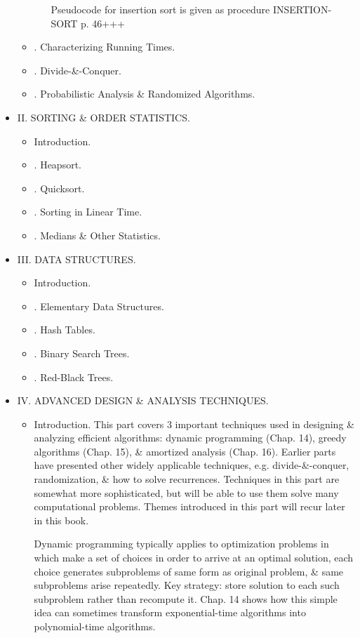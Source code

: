 \documentclass{article}
\begin{document}
\begin{itemize}
\begin{itemize}
\begin{itemize}
            Pseudocode for insertion sort is given as procedure INSERTION-SORT p. 46+++
        \end{itemize}
		\item {. Characterizing Running Times.}
		\item {. Divide-\&-Conquer.}
		\item {. Probabilistic Analysis \& Randomized Algorithms.}
	\end{itemize}
	\item {\sf II. SORTING \& ORDER STATISTICS.}
	\begin{itemize}
		\item {\sf Introduction.}
		\item {. Heapsort.}
		\item {. Quicksort.}
		\item {. Sorting in Linear Time.}
		\item {. Medians \& Other Statistics.}
	\end{itemize}
	\item {\sf III. DATA STRUCTURES.}
	\begin{itemize}
		\item {\sf Introduction.}
		\item {. Elementary Data Structures.}
		\item {. Hash Tables.}
		\item {. Binary Search Trees.}
		\item {. Red-Black Trees.}
	\end{itemize}
	\item {\sf IV. ADVANCED DESIGN \& ANALYSIS TECHNIQUES.}
	\begin{itemize}
		\item {\sf Introduction.} This part covers 3 important techniques used in designing \& analyzing efficient algorithms: dynamic programming (Chap. 14), greedy algorithms (Chap. 15), \& amortized analysis (Chap. 16). Earlier parts have presented other widely applicable techniques, e.g. divide-\&-conquer, randomization, \& how to solve recurrences. Techniques in this part are somewhat more sophisticated, but will be able to use them solve many computational problems. Themes introduced in this part will recur later in this book.
		
		Dynamic programming typically applies to optimization problems in which make a set of choices in order to arrive at an optimal solution, each choice generates subproblems of same form as original problem, \& same subproblems arise repeatedly. Key strategy: store solution to each such subproblem rather than recompute it. Chap. 14 shows how this simple idea can sometimes transform exponential-time algorithms into polynomial-time algorithms.
		

\end{itemize}
\end{itemize}
\end{document}
